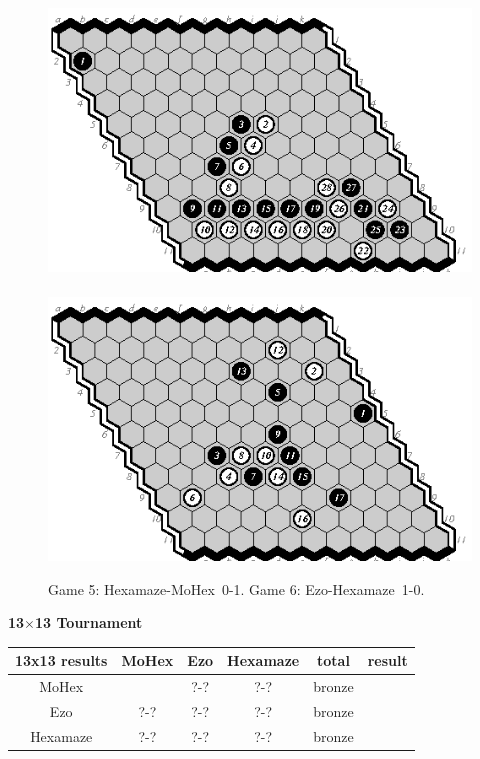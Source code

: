 \documentclass{icga}
\def\Eo{\mbox{\sc Ezo}}
\def\Hz{\mbox{\sc Hexamaze}}
\def\Mx{\mbox{\sc MoHex}}
\begin{document}
\begin{figure}[hbp]
\includegraphics[scale=1.3]{games/hexdiag/05-hm-0-1.eps}\hspace*{-1cm}\
\includegraphics[scale=1.3]{games/hexdiag/06-eh-1-0.eps}
\caption{Game 5: \Hz-\Mx\ 0-1. Game 6: \Eo-\Hz\ 1-0.}
\end{figure}

\newpage
\newpage
\newpage
{\large\bf 13$\times$13 Tournament}


\hfill\begin{tabular}{|c|c|c|c|c|c|}
\hline 13x13 results &\Mx{} &\Eo{}  &\Hz{}   & total & result \\ 
\hline \Mx{} &      &  ?-?    & ?-?  & bronze \\
\hline \Eo{} &  ?-? &  ?-?    & ?-?  & bronze \\
\hline \Hz{} &  ?-? &  ?-?    & ?-?  & bronze \\
\hline
\end{tabular}\hfill~
\end{document}
